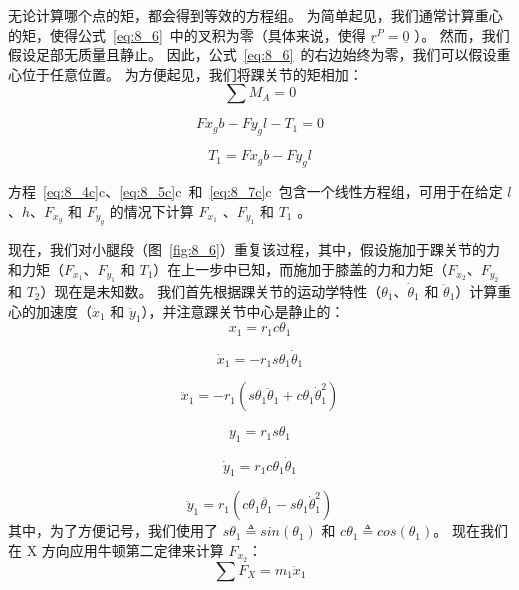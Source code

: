 无论计算哪个点的矩，都会得到等效的方程组。
为简单起见，我们通常计算重心的矩，使得公式~\ref{eq:8_6}~中的叉积为零（具体来说，使得 $\underline{r} ^P = \underline{0}$ ）。
然而，我们假设足部无质量且静止。
因此，公式~\ref{eq:8_6}~的右边始终为零，我们可以假设重心位于任意位置。
为方便起见，我们将踝关节的矩相加：
%
\begin{equation}
	\sum M_A = 0
	\label{eq:8_7a}
\end{equation}

\begin{equation}
	F x_g b - F y_g l - T_1 = 0
	\label{eq:8_7b}
\end{equation}

\begin{equation}
	T_1 = F x_g b - F y_g l
	\label{eq:8_7c}
\end{equation}

方程~\ref{eq:8_4c}c、\ref{eq:8_5c}c~和~\ref{eq:8_7c}c~包含一个线性方程组，可用于在给定 $l$、$h$、$F_{x_g}$ 和 $F_{y_g}$ 的情况下计算 $F_{x_1}$ 、$F_{y_1}$ 和 $T_1$ 。


现在，我们对小腿段（图~\ref{fig:8_6}）重复该过程，其中，假设施加于踝关节的力和力矩（$F_{x_1}$、$F_{y_1}$ 和 $T_1$）在上一步中已知，而施加于膝盖的力和力矩（$F_{x_2}$、$F_{y_2}$ 和 $T_2$）现在是未知数。
我们首先根据踝关节的运动学特性（$\theta_1$、$\dot{\theta}_1$ 和 $\ddot{\theta}_1$）计算重心的加速度（$\ddot{x}_1$ 和 $\ddot{y}_1$），并注意踝关节中心是静止的：
%
\begin{equation}
	x_1 = r_1 c \theta_1
	\label{eq:8_8a}
\end{equation}

\begin{equation}
	\dot{x}_1 = - r_1 s \theta_1 \dot{\theta}_1
	\label{eq:8_8b}
\end{equation}

\begin{equation}
	\ddot{x}_1 = - r_1 ( s \theta_1 \ddot{\theta}_1 + c \theta_1 \dot{\theta}_1^2 )
	\label{eq:8_8c}
\end{equation}

\begin{equation}
	y_1 = r_1 s \theta_1
\end{equation}

\begin{equation}
	\dot{y}_1 = r_1 c \theta_1 \dot{\theta}_1
	\label{eq:8_9b}
\end{equation}

\begin{equation}
	\ddot{y}_1 = r_1 ( c \theta_1 \ddot{\theta_1}  -  s \theta_1 \dot{\theta}_1^2 )
	\label{eq:8_9c}
\end{equation}
%
其中，为了方便记号，我们使用了 $s \theta_1 \triangleq  sin (\theta_1)$ 和 $c \theta_1  \triangleq  cos (\theta_1)$。
现在我们在 X 方向应用牛顿第二定律来计算 $F_{x_2}$：
%
\begin{equation}
	\sum F_X = m_1 \ddot{x}_1
	\label{eq:8_10a}
\end{equation}

